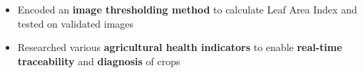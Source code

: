 \documentclass{article}
\begin{document}
\begin{itemize}[itemsep = -0.65 mm, leftmargin=*]
\item Encoded an \textbf{image thresholding method} to calculate Leaf Area Index and tested on validated images
\item Researched various \textbf{agricultural health indicators} to enable \textbf{real-time traceability} and \textbf{diagnosis} of crops




\end{itemize}
\end{document}
